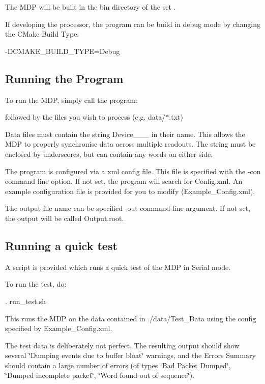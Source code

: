 The M\+DP will be built in the {\ttfamily bin} directory of the set {\ttfamily }.

If developing the processor, the program can be build in debug mode by changing the C\+Make Build Type\+: 
\begin{DoxyCode}
-DCMAKE\_BUILD\_TYPE=Debug
\end{DoxyCode}


\subsection*{Running the Program}

To run the M\+DP, simply call the program\+: 
 followed by the files you wish to process (e.\+g. {\ttfamily data/$\ast$.txt})

Data files must contain the string {\ttfamily Device\+\_\+\+\_\+\+\_\+} in their name. This allows the M\+DP to properly synchronise data across multiple readouts. The string must be enclosed by underscores, but can contain any words on either side.

The program is configured via a xml config file. This file is specified with the {\ttfamily -\/con} command line option. If not set, the program will search for {\ttfamily Config.\+xml}. An example configuration file is provided for you to modify ({\ttfamily Example\+\_\+\+Config.\+xml}).

The output file name can be specified {\ttfamily -\/out} command line argument. If not set, the output will be called {\ttfamily Output.\+root}.

\subsection*{Running a quick test}

A script is provided which runs a quick test of the M\+DP in {\ttfamily Serial} mode.

To run the test, do\+: 
\begin{DoxyCode}
. run\_test.sh
\end{DoxyCode}


This runs the M\+DP on the data contained in {\ttfamily ./data/\+Test\+\_\+\+Data} using the config specified by {\ttfamily Example\+\_\+\+Config.\+xml}.

The test data is deliberately not perfect. The resulting output should show several \char`\"{}\+Dumping events due to buffer bloat\char`\"{} warnings, and the Errors Summary should contain a large number of errors (of types \char`\"{}\+Bad Packet Dumped\char`\"{}, \char`\"{}\+Dumped incomplete packet\char`\"{}, \char`\"{}\+Word found out of sequence\char`\"{}).

